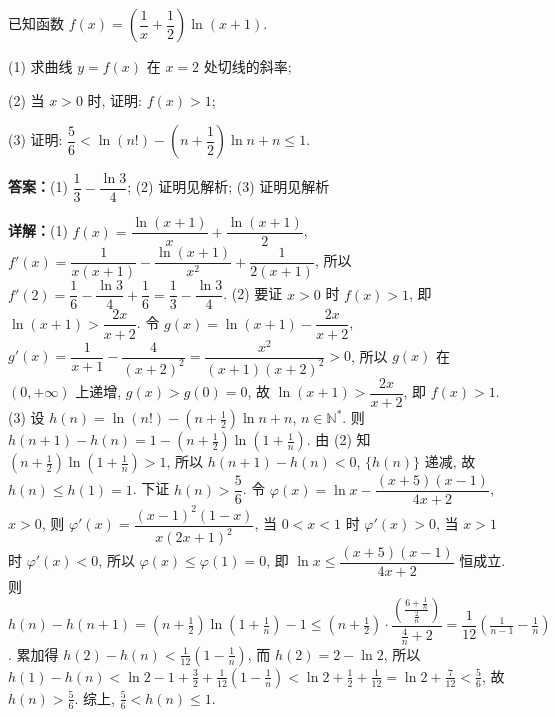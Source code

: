 \begin{question}[points=16]
已知函数 $f(x) = \left(\dfrac{1}{x} + \dfrac{1}{2}\right)\ln(x+1)$.

(1) 求曲线 $y = f(x)$ 在 $x = 2$ 处切线的斜率;

(2) 当 $x > 0$ 时, 证明: $f(x) > 1$;

(3) 证明: $\dfrac{5}{6} < \ln(n!) - \left(n+\dfrac{1}{2}\right)\ln n + n \le 1$.
\begin{solution}
\textbf{答案：}(1) $\dfrac{1}{3} - \dfrac{\ln 3}{4}$; (2) 证明见解析; (3) 证明见解析

\textbf{详解：}(1) $f(x) = \dfrac{\ln(x+1)}{x} + \dfrac{\ln(x+1)}{2}$, $f'(x) = \dfrac{1}{x(x+1)} - \dfrac{\ln(x+1)}{x^2} + \dfrac{1}{2(x+1)}$, 所以 $f'(2) = \dfrac{1}{6} - \dfrac{\ln3}{4} + \dfrac{1}{6} = \dfrac{1}{3} - \dfrac{\ln3}{4}$.
(2) 要证 $x>0$ 时 $f(x) > 1$, 即 $\ln(x+1) > \dfrac{2x}{x+2}$. 令 $g(x) = \ln(x+1) - \dfrac{2x}{x+2}$, $g'(x) = \dfrac{1}{x+1} - \dfrac{4}{(x+2)^2} = \dfrac{x^2}{(x+1)(x+2)^2} > 0$, 所以 $g(x)$ 在 $(0,+\infty)$ 上递增, $g(x) > g(0) = 0$, 故 $\ln(x+1) > \dfrac{2x}{x+2}$, 即 $f(x) > 1$.
(3) 设 $h(n) = \ln(n!) - \left(n+\frac{1}{2}\right)\ln n + n$, $n \in \mathbb{N}^*$. 则 $h(n+1)-h(n) = 1 - \left(n+\frac{1}{2}\right)\ln\left(1+\frac{1}{n}\right)$. 由 (2) 知 $\left(n+\frac{1}{2}\right)\ln\left(1+\frac{1}{n}\right) > 1$, 所以 $h(n+1)-h(n) < 0$, $\{h(n)\}$ 递减, 故 $h(n) \le h(1) = 1$. 下证 $h(n) > \dfrac{5}{6}$. 令 $\varphi(x) = \ln x - \dfrac{(x+5)(x-1)}{4x+2}$, $x>0$, 则 $\varphi'(x) = \dfrac{(x-1)^2(1-x)}{x(2x+1)^2}$, 当 $0<x<1$ 时 $\varphi'(x)>0$, 当 $x>1$ 时 $\varphi'(x)<0$, 所以 $\varphi(x) \le \varphi(1)=0$, 即 $\ln x \le \dfrac{(x+5)(x-1)}{4x+2}$ 恒成立. 则 $h(n)-h(n+1) = \left(n+\frac{1}{2}\right)\ln\left(1+\frac{1}{n}\right) - 1 \le \left(n+\frac{1}{2}\right) \cdot \dfrac{\left(\frac{6+\frac{1}{n}}{\frac{2}{n}}\right)}{\frac{4}{n}+2} = \dfrac{1}{12}\left(\frac{1}{n-1} - \frac{1}{n}\right)$. 累加得 $h(2)-h(n) < \frac{1}{12}\left(1-\frac{1}{n}\right)$, 而 $h(2) = 2-\ln2$, 所以 $h(1)-h(n) < \ln2 - 1 + \frac{3}{2} + \frac{1}{12}\left(1-\frac{1}{n}\right) < \ln2 + \frac{1}{2} + \frac{1}{12} = \ln2 + \frac{7}{12} < \frac{5}{6}$, 故 $h(n) > \frac{5}{6}$. 综上, $\frac{5}{6} < h(n) \le 1$.
\end{solution}
\end{question}

